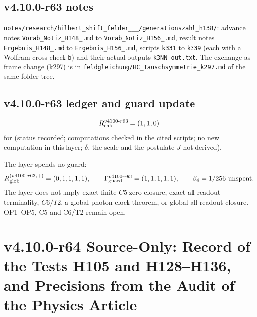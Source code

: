 \subsection*{v4.10.0-r63 notes}
\label{subsec:v4100-r63-notes}

{\raggedright
\texttt{notes/\allowbreak research/\allowbreak hilbert\_\allowbreak shift\_\allowbreak felder\_\_\_/\allowbreak generationszahl\_\allowbreak h138/}:
advance notes \texttt{Vorab\_\allowbreak Notiz\_\allowbreak H148\_\allowbreak *.md} to \texttt{Vorab\_\allowbreak Notiz\_\allowbreak H156\_\allowbreak *.md}, result notes
\texttt{Ergebnis\_\allowbreak H148\_\allowbreak *.md} to \texttt{Ergebnis\_\allowbreak H156\_\allowbreak *.md}, scripts \texttt{k331} to \texttt{k339} (each with a
Wolfram cross-check \texttt{b}) and their actual outputs \texttt{k3NN\_\allowbreak out.txt}.  The exchange as frame change (k297) is in
\texttt{feldgleichung/\allowbreak HC\_\allowbreak Tauschsymmetrie\_\allowbreak k297.md} of the same folder tree.
\par}

\subsection*{v4.10.0-r63 ledger and guard update}
\label{subsec:v4100-r63-ledger-guard}

\[
R_{\rm chk}^{v4100\text{-}r63}=(1,1,0)
\]
for (status recorded; computations checked in the cited scripts; no new computation in this layer; \(\delta\), the scale and the postulate \(J\) not derived).

The layer spends no guard:
\[
R_{\rm glob}^{(v4100\text{-}r63,+)}=(0,1,1,1,1),
\qquad
\Gamma_{\rm guard}^{v4100\text{-}r63}=(1,1,1,1,1),
\qquad
\beta_4=1/256\ \text{unspent}.
\]
The layer does not imply exact finite \(C5\) zero closure, exact all-readout terminality, \(C6/T2\), a global photon-clock theorem,
or global all-readout closure.  OP1--OP5, C5 and C6/T2 remain open.

\clearpage
\section*{v4.10.0-r64 Source-Only: Record of the Tests H105 and H128--H136, and Precisions from the Audit of the Physics Article}
\label{sec:v4100-r64-record-audit}

